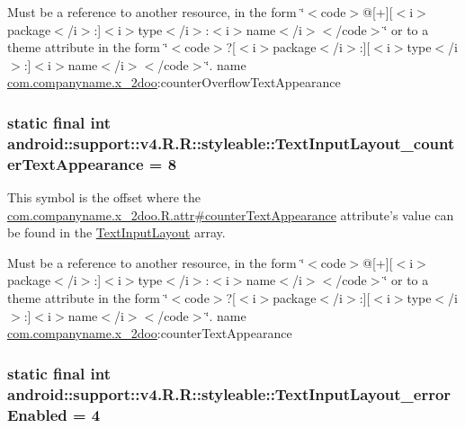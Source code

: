 Must be a reference to another resource, in the form \char`\"{}$<$code$>$@\mbox{[}+\mbox{]}\mbox{[}$<$i$>$package$<$/i$>$:\mbox{]}$<$i$>$type$<$/i$>$:$<$i$>$name$<$/i$>$$<$/code$>$\char`\"{} or to a theme attribute in the form \char`\"{}$<$code$>$?\mbox{[}$<$i$>$package$<$/i$>$:\mbox{]}\mbox{[}$<$i$>$type$<$/i$>$:\mbox{]}$<$i$>$name$<$/i$>$$<$/code$>$\char`\"{}.  name \hyperlink{namespacecom_1_1companyname_1_1x__2doo}{com.companyname.x\_\-2doo}:counterOverflowTextAppearance \hypertarget{classandroid_1_1support_1_1v4_1_1_r_1_1styleable_e2035c0839f7355fa9fda8b0c9a8dd46}{
\subsubsection[{TextInputLayout\_\-counterTextAppearance}]{\setlength{\rightskip}{0pt plus 5cm}static final int android::support::v4.R.R::styleable::TextInputLayout\_\-counterTextAppearance = 8}}
\label{classandroid_1_1support_1_1v4_1_1_r_1_1styleable_e2035c0839f7355fa9fda8b0c9a8dd46}


This symbol is the offset where the \hyperlink{classcom_1_1companyname_1_1x__2doo_1_1_r_1_1attr_819ed9953ffe3f04964f8dd2efafeb6e}{com.companyname.x\_\-2doo.R.attr\#counterTextAppearance} attribute's value can be found in the \hyperlink{classandroid_1_1support_1_1v4_1_1_r_1_1styleable_880beb171ce483ab1b63a82ef7f9d976}{TextInputLayout} array.

Must be a reference to another resource, in the form \char`\"{}$<$code$>$@\mbox{[}+\mbox{]}\mbox{[}$<$i$>$package$<$/i$>$:\mbox{]}$<$i$>$type$<$/i$>$:$<$i$>$name$<$/i$>$$<$/code$>$\char`\"{} or to a theme attribute in the form \char`\"{}$<$code$>$?\mbox{[}$<$i$>$package$<$/i$>$:\mbox{]}\mbox{[}$<$i$>$type$<$/i$>$:\mbox{]}$<$i$>$name$<$/i$>$$<$/code$>$\char`\"{}.  name \hyperlink{namespacecom_1_1companyname_1_1x__2doo}{com.companyname.x\_\-2doo}:counterTextAppearance \hypertarget{classandroid_1_1support_1_1v4_1_1_r_1_1styleable_552cb08a36003494a2f75ebfe70de3f7}{
\subsubsection[{TextInputLayout\_\-errorEnabled}]{\setlength{\rightskip}{0pt plus 5cm}static final int android::support::v4.R.R::styleable::TextInputLayout\_\-errorEnabled = 4}}
\label{classandroid_1_1support_1_1v4_1_1_r_1_1styleable_552cb08a36003494a2f75ebfe70de3f7}


